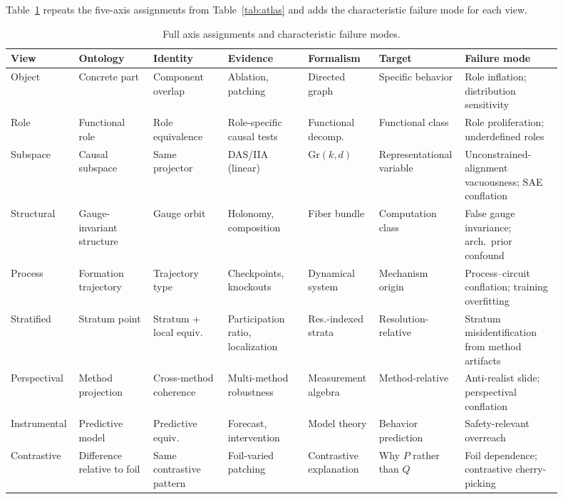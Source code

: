 \documentclass{article}
\newcommand{\Gr}{\mathrm{Gr}}
\begin{document}
Table~\ref{tab:full} repeats the five-axis assignments from
Table~\ref{tab:atlas} and adds the characteristic failure mode for each
view.

\begin{table}[H]
\centering
\footnotesize
\setlength{\tabcolsep}{3pt}
\begin{tabular}{p{0.09\linewidth}p{0.13\linewidth}p{0.13\linewidth}p{0.14\linewidth}p{0.12\linewidth}p{0.12\linewidth}p{0.17\linewidth}}
\toprule
\textbf{View} & \textbf{Ontology}
  & \textbf{Identity} & \textbf{Evidence}
  & \textbf{Formalism} & \textbf{Target}
  & \textbf{Failure mode} \\
\midrule
Object
  & Concrete part
  & Component overlap
  & Ablation, patching
  & Directed graph
  & Specific behavior
  & Role inflation; distribution sensitivity \\[2pt]
Role
  & Functional role
  & Role equivalence
  & Role-specific causal tests
  & Functional decomp.
  & Functional class
  & Role proliferation; underdefined roles \\[2pt]
Subspace
  & Causal subspace
  & Same projector
  & DAS/IIA (linear)
  & $\Gr(k,d)$
  & Representational variable
  & Unconstrained-alignment vacuousness; SAE conflation \\[2pt]
Structural
  & Gauge-invariant structure
  & Gauge orbit
  & Holonomy, composition
  & Fiber bundle
  & Computation class
  & False gauge invariance; arch.\ prior confound \\[2pt]
Process
  & Formation trajectory
  & Trajectory type
  & Checkpoints, knockouts
  & Dynamical system
  & Mechanism origin
  & Process--circuit conflation; training overfitting \\[2pt]
Stratified
  & Stratum point
  & Stratum + local equiv.
  & Participation ratio, localization
  & Res.-indexed strata
  & Resolution-relative
  & Stratum misidentification from method artifacts \\[2pt]
Perspectival
  & Method projection
  & Cross-method coherence
  & Multi-method robustness
  & Measurement algebra
  & Method-relative
  & Anti-realist slide; perspectival conflation \\[2pt]
Instrumental
  & Predictive model
  & Predictive equiv.
  & Forecast, intervention
  & Model theory
  & Behavior prediction
  & Safety-relevant overreach \\[2pt]
Contrastive
  & Difference relative to foil
  & Same contrastive pattern
  & Foil-varied patching
  & Contrastive explanation
  & Why $P$ rather than $Q$
  & Foil dependence; contrastive cherry-picking \\
\bottomrule
\end{tabular}
\caption{Full axis assignments and characteristic failure modes.}
\label{tab:full}
\end{table}
\end{document}
